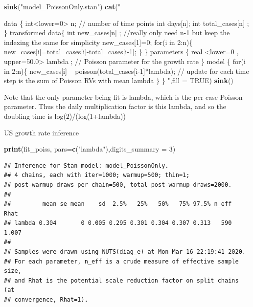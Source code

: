 \documentclass[]{article}
\newenvironment{Shaded}{\begin{snugshade}}{\end{snugshade}}
\newcommand{\DataTypeTok}[1]{\textcolor[rgb]{0.13,0.29,0.53}{#1}}
\newcommand{\DecValTok}[1]{\textcolor[rgb]{0.00,0.00,0.81}{#1}}
\newcommand{\KeywordTok}[1]{\textcolor[rgb]{0.13,0.29,0.53}{\textbf{#1}}}
\newcommand{\NormalTok}[1]{#1}
\newcommand{\OtherTok}[1]{\textcolor[rgb]{0.56,0.35,0.01}{#1}}
\newcommand{\StringTok}[1]{\textcolor[rgb]{0.31,0.60,0.02}{#1}}
\begin{document}
\begin{Shaded}
\begin{Highlighting}[]
\KeywordTok{sink}\NormalTok{(}\StringTok{"model_PoissonOnly.stan"}\NormalTok{)}
\KeywordTok{cat}\NormalTok{(}\StringTok{"}

\StringTok{    data \{}
\StringTok{    int<lower=0> n; // number of time points}
\StringTok{    int days[n];}
\StringTok{    int total_cases[n] ;}
\StringTok{    \}}
\StringTok{    transformed data\{}
\StringTok{    int new_cases[n] ; //really only need n-1 but keep the indexing the same for simplicity}
\StringTok{    new_cases[1]=0;}
\StringTok{    for(i in 2:n)\{}
\StringTok{    new_cases[i]=total_cases[i]-total_cases[i-1];}
\StringTok{    \}}
\StringTok{    \}}
\StringTok{    parameters \{}
\StringTok{    real <lower=0 , upper=50.0> lambda ; // Poisson parameter for the growth rate}
\StringTok{    \}}
\StringTok{    model \{}
\StringTok{    for(i in 2:n)\{}
\StringTok{    new_cases[i] ~ poisson(total_cases[i-1]*lambda); // update for each time step is the sum of Poisson RVs with mean lambda}
\StringTok{    \}}
\StringTok{    \}}
\StringTok{    }
\StringTok{      }
\StringTok{    }
\StringTok{    "}\NormalTok{,}\DataTypeTok{fill =} \OtherTok{TRUE}\NormalTok{)}
\KeywordTok{sink}\NormalTok{()}
\end{Highlighting}
\end{Shaded}

Note that the only parameter being fit is lambda, which is the per case
Poisson parameter. Thus the daily multiplication factor is this lambda,
and so the doubling time is log(2)/(log(1+lambda))

US growth rate inference

\begin{Shaded}
\begin{Highlighting}[]
\KeywordTok{print}\NormalTok{(fit_poiss, }\DataTypeTok{pars=}\KeywordTok{c}\NormalTok{(}\StringTok{"lambda"}\NormalTok{),}\DataTypeTok{digits_summary =} \DecValTok{3}\NormalTok{)}
\end{Highlighting}
\end{Shaded}

\begin{verbatim}
## Inference for Stan model: model_PoissonOnly.
## 4 chains, each with iter=1000; warmup=500; thin=1; 
## post-warmup draws per chain=500, total post-warmup draws=2000.
## 
##         mean se_mean    sd  2.5%   25%   50%   75% 97.5% n_eff  Rhat
## lambda 0.304       0 0.005 0.295 0.301 0.304 0.307 0.313   590 1.007
## 
## Samples were drawn using NUTS(diag_e) at Mon Mar 16 22:19:41 2020.
## For each parameter, n_eff is a crude measure of effective sample size,
## and Rhat is the potential scale reduction factor on split chains (at 
## convergence, Rhat=1).
\end{verbatim}
\end{document}

